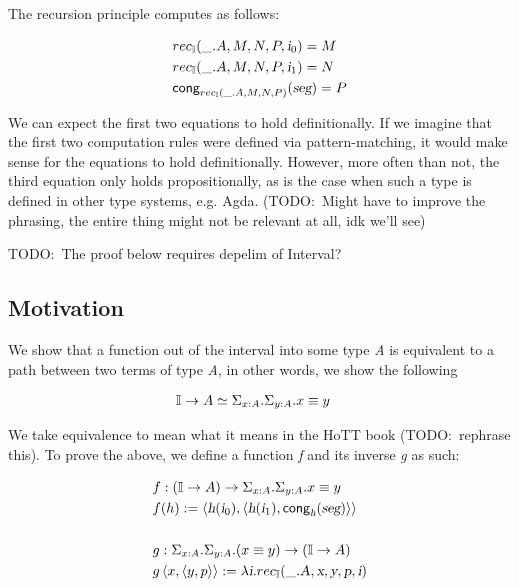\documentclass[11pt]{article}
\newcommand\kw[1] {\textsf{#1}}
\newcommand\id[1] {\textsl{#1}}
\begin{document}
The recursion principle computes as follows:

\begin{align*}
  & rec_{\bI}(\_ . A, M, N, P, \ileft) = M \\
  & rec_{\bI}(\_ . A, M, N, P, \iright) = N \\
  & \kw{cong}_{rec_{\bI}(\_ . A, M, N, P)}(\id{seg}) = P
\end{align*}

We can expect the first two equations to hold definitionally. If we imagine that the first two computation rules were defined via pattern-matching, it would make sense for the equations to hold definitionally. However, more often than not, the third equation only holds propositionally, as is the case when such a type is defined in other type systems, e.g. Agda. (TODO:\ Might have to improve the phrasing, the entire thing might not be relevant at all, idk we'll see)

TODO:\ The proof below requires depelim of Interval?

\subsection{Motivation}
We show that a function out of the interval into some type \id{A} is equivalent to a path between two terms of type \id{A}, in other words, we show the following

\begin{align*}
  & \bI \rightarrow A \simeq \Sigma_{\oftype{x}{A}} . \Sigma_{\oftype{y}{A}} . \eqtype{x}{y}
\end{align*}

We take equivalence to mean what it means in the HoTT book (TODO:\ rephrase this). To prove the above, we define a function \id{f} and its inverse \id{g} as such:

\begin{align*}
  & f : (\bI \rightarrow A) \rightarrow \Sigma_{\oftype{x}{A}} . \Sigma_{\oftype{y}{A}} . \eqtype{x}{y} \\
  & f(h) := \braket{\id{h}(\ileft), \braket{\id{h}(\iright), \kw{cong}_{\id{h}}(\id{seg})}} \\ \\
  & g : \Sigma_{\oftype{x}{A}} . \Sigma_{\oftype{y}{A}} . (\eqtype{x}{y}) \rightarrow  (\bI \rightarrow A) \\
  & g \braket{x, \braket{y, p}} := \lambda \id{i} . rec_{\bI}(\_ . \id{A}, \id{x}, \id{y}, \id{p}, \id{i})
\end{align*}
\end{document}

